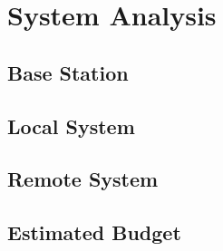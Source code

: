 \documentclass[12pt, letterpaper]{report}
\begin{document}
\clearpage


\chapter{System Analysis}

\section{Base Station}


\clearpage
\section{Local System}


\clearpage
\section{Remote System}


\clearpage
\section{Estimated Budget}


\clearpage





\end{document}
